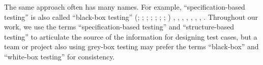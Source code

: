 The same approach often has many names. For example,
``specification-based testing'' is also called
``black-box testing''
\def\noHyphenFn{\footnote{\refHelper \citet{Firesmith2015} excludes the hyphen,
        calling it ``black box testing''.}}
\ifnotpaper
    (\citealp[p.~9]{IEEE2022}; \citeyear[p.~8]{IEEE2021c};
    \citeyear[p.~431]{IEEE2017}; \citealp[p.~5\=/10]{SWEBOK2024};
    \citealpISTQB{}; \citealp[pp.~46\==47\noHyphenFn]{Firesmith2015};
    \citealp[p.~344]{SakamotoEtAl2013}; \citealp[p.~399]{vanVliet2000})\else
    \cite[pp.~46\==47\noHyphenFn]{Firesmith2015}, \cite[p.~399]{vanVliet2000},
    \cite[p.~5\=/10]{SWEBOK2024}, \cite[p.~431]{IEEE2017},
    \cite[p.~9]{IEEE2022}, \cite{ISTQB}, \cite[p.~8]{IEEE2021c},
    \cite[p.~344]{SakamotoEtAl2013}\fi.
Throughout our work, we use the terms
``specification-based testing'' and ``structure-based testing'' to articulate
the source of the information for designing test cases, but a team or project
also using grey-box testing may prefer the terms ``black-box'' and ``white-box
testing'' for consistency.

